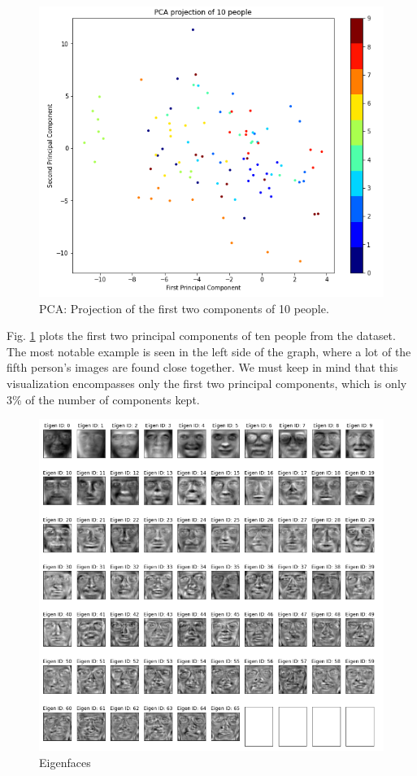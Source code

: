\documentclass[conference]{IEEEtran}
\begin{document}
\begin{figure}
    \centering
    \includegraphics[scale=0.75]{images/3_pca_projection_10_people.png}
    \caption{PCA: Projection of the first two components of 10 people.}
    \label{fig:pca_projection_10_people}
\end{figure}

Fig. \ref{fig:pca_projection_10_people} plots the first two principal components of ten people from the dataset. The most notable example is seen in the left side of the graph,  where a lot of the fifth person's images are found close together. We must keep in mind that this visualization encompasses only the first two principal components, which is only 3\% of the number of components kept.

\begin{figure}
    \centering
    \includegraphics[scale=0.5]{images/7_eigenfaces.png}
    \caption{Eigenfaces}
    \label{fig:eigenfaces}
\end{figure}
\end{document}
